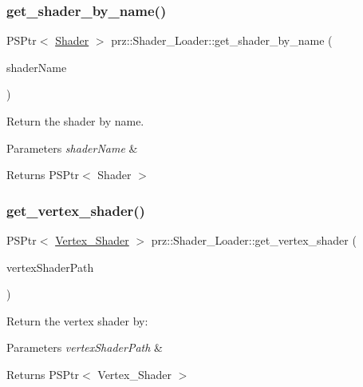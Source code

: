 \subsubsection{\texorpdfstring{get\_shader\_by\_name()}{get\_shader\_by\_name()}}
{\footnotesize\ttfamily P\+S\+Ptr$<$ \mbox{\hyperlink{classprz_1_1_shader}{Shader}} $>$ prz\+::\+Shader\+\_\+\+Loader\+::get\+\_\+shader\+\_\+by\+\_\+name (\begin{DoxyParamCaption}\item[{const P\+String \&}]{shader\+Name }\end{DoxyParamCaption})\hspace{0.3cm}{\ttfamily [inline]}}



Return the shader by name. 


\begin{DoxyParams}{Parameters}
{\em shader\+Name} & \\
\hline
\end{DoxyParams}
\begin{DoxyReturn}{Returns}
P\+S\+Ptr$<$ Shader $>$ 
\end{DoxyReturn}
\mbox{\label{classprz_1_1_shader___loader_a048561e8c18f09fff2eaf758b6efd79f}} 
\subsubsection{\texorpdfstring{get\_vertex\_shader()}{get\_vertex\_shader()}}
{\footnotesize\ttfamily P\+S\+Ptr$<$ \mbox{\hyperlink{classprz_1_1_vertex___shader}{Vertex\+\_\+\+Shader}} $>$ prz\+::\+Shader\+\_\+\+Loader\+::get\+\_\+vertex\+\_\+shader (\begin{DoxyParamCaption}\item[{const P\+String \&}]{vertex\+Shader\+Path }\end{DoxyParamCaption})\hspace{0.3cm}{\ttfamily [inline]}}



Return the vertex shader by\+: 


\begin{DoxyParams}{Parameters}
{\em vertex\+Shader\+Path} & \\
\hline
\end{DoxyParams}
\begin{DoxyReturn}{Returns}
P\+S\+Ptr$<$ Vertex\+\_\+\+Shader $>$ 
\end{DoxyReturn}
\mbox{\label{classprz_1_1_shader___loader_a3f91c84b6fe8b57444de25fb6d467a51}} 
